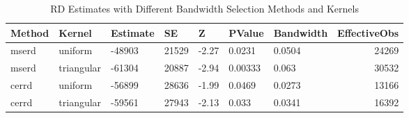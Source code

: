 \begin{table}[ht]
\centering

\caption{RD Estimates with Different Bandwidth Selection Methods and Kernels} 
\label{tab:rd_bandwidth_kernel_results}
\begin{tabular}{lllllllr}
  \hline
Method & Kernel & Estimate & SE & Z & PValue & Bandwidth & EffectiveObs \\ 
  \hline
mserd & uniform & -48903 & 21529 & -2.27 & 0.0231 & 0.0504 & 24269 \\ 
  mserd & triangular & -61304 & 20887 & -2.94 & 0.00333 & 0.063 & 30532 \\ 
  cerrd & uniform & -56899 & 28636 & -1.99 & 0.0469 & 0.0273 & 13166 \\ 
  cerrd & triangular & -59561 & 27943 & -2.13 & 0.033 & 0.0341 & 16392 \\ 
   \hline
\end{tabular}
\end{table}

